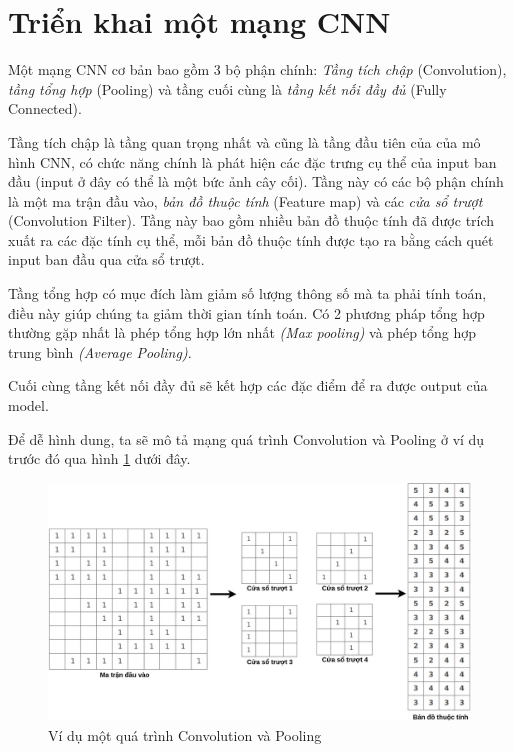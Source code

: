 \section{Triển khai một mạng CNN}
\hspace{\parindent} Một mạng CNN cơ bản bao gồm 3 bộ phận chính: \textit{Tầng tích chập} (Convolution),  \textit{tầng tổng hợp} (Pooling) và tầng cuối cùng là \textit{tầng kết nối đầy đủ} (Fully Connected).

Tầng tích chập là tầng quan trọng nhất và cũng là tầng đầu tiên của của mô hình CNN, có chức năng chính là phát hiện các đặc trưng cụ thể của input ban đầu (input ở đây có thể là một bức ảnh cây cối). Tầng này có các bộ phận chính là một ma trận đầu vào, \textit{bản đồ thuộc tính} (Feature map) và các \textit{cửa sổ trượt} (Convolution Filter). Tầng này bao gồm nhiều bản đồ thuộc tính đã được trích xuất ra các đặc tính cụ thể, mỗi bản đồ thuộc tính được tạo ra bằng cách quét input ban đầu qua cửa sổ trượt.

Tầng tổng hợp có mục đích làm giảm số lượng thông số mà ta phải tính toán, điều này giúp chúng ta giảm thời gian tính toán. Có 2 phương pháp tổng hợp thường gặp nhất là phép tổng hợp lớn nhất \textit{(Max pooling)} và phép tổng hợp trung bình \textit{(Average Pooling)}.

Cuối cùng tầng kết nối đầy đủ sẽ kết hợp các đặc điểm để ra được output của model.

Để dễ hình dung, ta sẽ mô tả mạng quá trình Convolution và Pooling ở ví dụ trước đó qua hình \ref{fig:convolutionexample7} dưới đây.

\begin{figure}[!h]
	\centering
		\includegraphics[width=1\columnwidth]{chapter05/figure/convolution-example-7.jpg}
        \caption{Ví dụ một quá trình Convolution và Pooling}
        \label{fig:convolutionexample7}
\end{figure}

